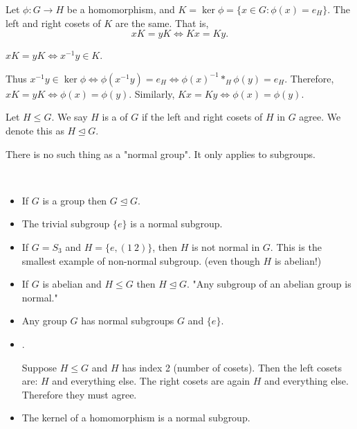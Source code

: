 \documentclass[class=article,crop=false]{standalone}
\begin{document}
\begin{thm}[]
	Let $ \phi:G \to H$ be a homomorphism, and $ K= \ker \phi = \{x \in G: \phi(x)=e_H\} $. The left and right cosets of $ K$ are the same. That is,
	\[
	xK = yK \iff Kx=Ky
	.\] 
\end{thm}

\begin{prf}

\begin{note}[]
$ xK = yK \iff x^{-1}y \in K$.
\end{note}
Thus $ x^{-1}y \in \ker \phi \iff \phi(x^{-1}y)=e_H \iff \phi(x)^{-1} *_H \phi(y) =e_H$. Therefore, $ xK = yK \iff \phi(x) = \phi(y)$. Similarly, $ Kx=Ky \iff \phi(x)=\phi(y)$.
\end{prf}

\begin{defn}
Let $ H \leq G$. We say  $ H$ is a   of $ G$ if the left and right cosets of  $ H$ in $ G$ agree. We denote this as $ H \trianglelefteq G$.
\end{defn}
\begin{note}[]
There is no such thing as a "normal group". It only applies to subgroups.
\end{note}

\begin{claim}[]
~\begin{itemize}
	\item If $ G$ is a group then  $ G \trianglelefteq G$.
	\item The trivial subgroup $ \{e\} $ is a normal subgroup.
	\item If $ G=S_3$ and $ H=\{e,(1\ 2)\} $, then $H$ is not normal in $ G$. This is the smallest example of non-normal subgroup. (even though $ H$ is abelian!)
	\item If $ G$ is abelian and  $ H \leq G$ then  $ H \trianglelefteq G$. "Any subgroup of an abelian group is normal."
	\item Any group $ G$ has normal subgroups  $ G$ and  $ \{e\} $.
	\item {}.
		\begin{prf}
			Suppose $ H \leq G$ and  $ H$ has index 2 (number of cosets). Then the left cosets are:  $ H$ and everything else. The right cosets are again  $ H$ and everything else. Therefore they must agree.
		\end{prf}
	\item The kernel of a homomorphism is a normal subgroup.
\end{itemize}
\end{claim}
\end{document}
